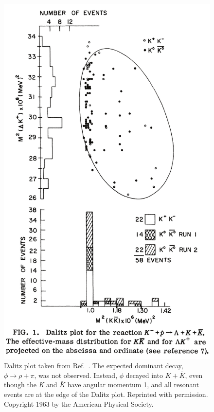 \documentclass[12pt]{article}
\begin{document}
\begin{figure}
\centering
\includegraphics[scale=0.14]{DalitzPlotA}
\caption{Dalitz plot taken from Ref.~\cite{phi2}. The expected dominant decay, $\phi\to \rho+\pi$, was not observed. Instead, $\phi$ decayed into $K+\bar K$, even though the {\it K} and $\bar K$ have angular momentum 1, and
all resonant events are at the edge of the Dalitz plot. Reprinted with permission. Copyright 1963 by the American Physical Society.
}
\label{fig:dalitz}
\end{figure}
\end{document}
